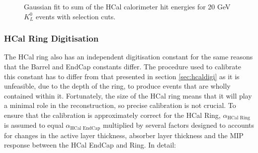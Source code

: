 \begin{figure}
\caption[Gaussian fit to sum of the HCal calorimeter hit energies for 20 GeV $K^{0}_{L}$ events with selection cuts.]{Gaussian fit to sum of the HCal calorimeter hit energies for 20 GeV $K^{0}_{L}$ events with selection cuts.}
\label{fig:hcaldigifit}
\end{figure}


\subsubsection{HCal Ring Digitisation}
\label{sec:hcalringdigi}
The HCal ring also has an independent digitisation constant for the same reasons that the Barrel and EndCap constants differ.  The procedure used to calibrate this constant has to differ from that presented in section \ref{sec:hcaldigi} as it is unfeasible, due to the depth of the ring, to produce events that are wholly contained within it.  Fortunately, the size of the HCal ring means that it will play a minimal role in the reconstruction, so precise calibration is not crucial.  To ensure that the calibration is approximately correct for the HCal Ring, $\alpha_{\text{HCal Ring}}$ is assumed to equal $\alpha_{\text{HCal EndCap}}$ multiplied by several factors designed to accounts for changes in the active layer thickness, absorber layer thickness and the MIP response between the HCal EndCap and Ring.  In detail:

